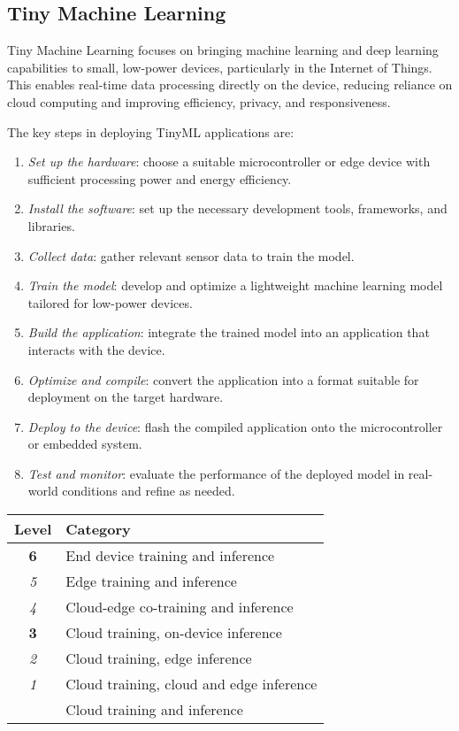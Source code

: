 \subsection{Tiny Machine Learning}
Tiny Machine Learning focuses on bringing machine learning and deep learning capabilities to small, low-power devices, particularly in the Internet of Things. 
This enables real-time data processing directly on the device, reducing reliance on cloud computing and improving efficiency, privacy, and responsiveness.  

The key steps in deploying TinyML applications are:  
\begin{enumerate}
    \item \textit{Set up the hardware}: choose a suitable microcontroller or edge device with sufficient processing power and energy efficiency.
    \item \textit{Install the software}: set up the necessary development tools, frameworks, and libraries.
    \item \textit{Collect data}: gather relevant sensor data to train the model.
    \item \textit{Train the model}: develop and optimize a lightweight machine learning model tailored for low-power devices.
    \item \textit{Build the application}: integrate the trained model into an application that interacts with the device.
    \item \textit{Optimize and compile}: convert the application into a format suitable for deployment on the target hardware.
    \item \textit{Deploy to the device}: flash the compiled application onto the microcontroller or embedded system.
    \item \textit{Test and monitor}: evaluate the performance of the deployed model in real-world conditions and refine as needed.
\end{enumerate}

\begin{table}[h]
    \centering
    \begin{tabular}{|c|l|}
        \hline
        \textbf{Level} & \textbf{Category} \\  
        \hline
        \textbf{6} & End device training and inference \\  
        \hline
        \textit{5} & Edge training and inference \\  
        \hline
        \textit{4} & Cloud-edge co-training and inference \\  
        \hline
        \textbf{3} & Cloud training, on-device inference \\  
        \hline
        \textit{2} & Cloud training, edge inference \\  
        \hline
        \textit{1} & Cloud training, cloud and edge inference \\  
        \hline
                   & Cloud training and inference \\  
        \hline
    \end{tabular}
\end{table}